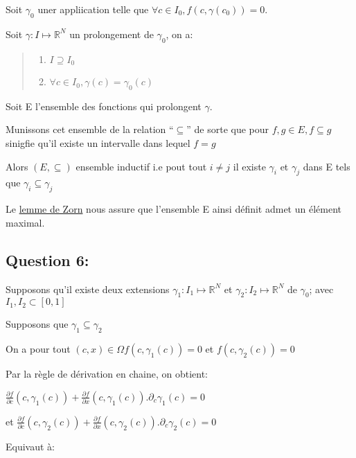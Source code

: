 \documentclass[11pt]{article}
\providecommand{\tightlist}{%
      \setlength{\itemsep}{0pt}\setlength{\parskip}{0pt}}
\begin{document}
    Soit \(\gamma _0\) uner appliication telle que
\(\forall c\in I_0, f(c,\gamma(c_0))=0\).

Soit \(\gamma : I\longmapsto \mathbb{R}^N\) un prolongement de
\(\gamma _0\), on a:

\begin{quote}
\begin{enumerate}
\def\labelenumi{(\alph{enumi})}
\tightlist
\item
  \(I \supseteq I_0\) 
\item
  \(\forall c\in I_0, \gamma(c)=\gamma _0(c)\)
\end{enumerate}
\end{quote}

    Soit E l'ensemble des fonctions qui prolongent \(\gamma\).

Munissons cet ensemble de la relation ``\(\subseteq\)'' de sorte que
pour \(f,g \in E, f\subseteq g\) sinigfie qu'il existe un intervalle
dans lequel \(f=g\)

Alors \((E,\subseteq)\) ensemble inductif i.e pout tout \(i\neq j\) il
existe \(\gamma _i\) et \(\gamma _j\) dans E tels que
\(\gamma _i \subseteq \gamma _j\)

Le
\href{https://en.wikipedia.org/wiki/Zorn\%27s_lemma?oldformat=true}{lemme
de Zorn} nous assure que l'ensemble E ainsi définit admet un élément
maximal.

    \hypertarget{question-6}{%
\subsection{\texorpdfstring{\textbf{Question
6:}}{Question 6:}}\label{question-6}}

    Supposons qu'il existe deux extensions
\(\gamma _1:I_1 \longmapsto \mathbb{R}^N\) et
\(\gamma _2:I_2 \longmapsto \mathbb{R}^N\) de \(\gamma _0\); avec
\(I_1, I_2\subset[0,1]\)

Supposons que \(\gamma _1 \subseteq \gamma _2\)

On a pour tout \((c,x)\in \Omega f(c,\gamma _1(c))=0\) et
\(f(c,\gamma _2(c))=0\)

Par la règle de dérivation en chaine, on obtient:

\(\frac{\partial f}{\partial c}(c,\gamma _1(c))+\frac{\partial f}{\partial x}(c,\gamma _1(c)).\partial _c \gamma _1(c)=0\)

et
\(\frac{\partial f}{\partial c}(c,\gamma _2(c))+\frac{\partial f}{\partial x}(c,\gamma _2(c)).\partial _c \gamma _2(c)=0\)

Equivaut à:
\end{document}
